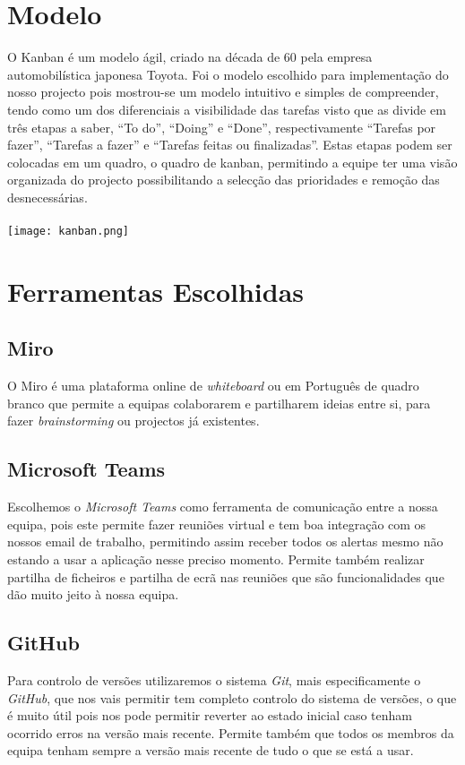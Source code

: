 \documentclass[a4paper]{article}
\begin{document}
\section{Modelo}
O Kanban é um modelo ágil, criado na década de 60 pela empresa automobilística japonesa Toyota.
Foi o modelo escolhido para implementação do nosso projecto pois mostrou-se um modelo intuitivo e simples de compreender, tendo como um dos diferenciais a visibilidade das tarefas visto que as divide em três etapas a saber, “To do”, “Doing” e “Done”, respectivamente “Tarefas por fazer”, “Tarefas a fazer” e “Tarefas feitas ou finalizadas”. Estas etapas podem ser colocadas em um quadro, o quadro de kanban, permitindo a equipe ter uma visão organizada do projecto possibilitando a selecção das prioridades e remoção das desnecessárias.
\\
\\
\texttt{[image: kanban.png]}


\newpage
\section{Ferramentas Escolhidas}
\subsection{Miro}
O Miro é uma plataforma online de \textit{whiteboard} ou em Português de quadro branco que permite a equipas colaborarem e partilharem ideias entre si, para fazer 
\textit{brainstorming} ou projectos já existentes.

\subsection{Microsoft Teams}
Escolhemos o \textit{Microsoft Teams} como ferramenta de comunicação entre a nossa equipa, pois este permite fazer reuniões virtual e tem boa integração com os nossos email de trabalho, permitindo assim receber todos os alertas mesmo não estando a usar a aplicação nesse preciso momento.
Permite também realizar partilha de ficheiros e partilha de ecrã nas reuniões que são funcionalidades que dão muito jeito à nossa equipa.

\subsection{GitHub}
Para controlo de versões utilizaremos o sistema \textit{Git}, mais especificamente o \textit{GitHub}, que nos vais permitir tem completo controlo do sistema de versões, o que é muito útil pois nos pode permitir reverter ao estado inicial caso tenham ocorrido erros na versão mais recente.
Permite também que todos os membros da equipa tenham sempre a versão mais recente de tudo o que se está a usar.
\end{document}
